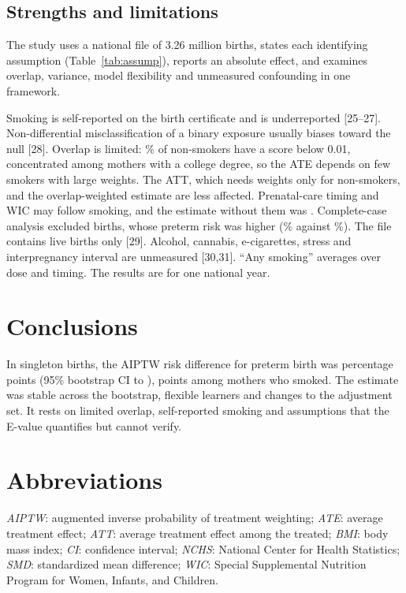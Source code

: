 \documentclass[11pt,letterpaper]{article}
\begin{document}
\subsection*{Strengths and limitations}
The study uses a national file of 3.26 million births, states each identifying assumption (Table~\ref{tab:assump}), reports an absolute effect, and examines overlap, variance, model flexibility and unmeasured confounding in one framework.

Smoking is self-reported on the birth certificate and is underreported [25--27]. Non-differential misclassification of a binary exposure usually biases toward the null [28]. Overlap is limited: \LowNon{}\% of non-smokers have a score below 0.01, concentrated among mothers with a college degree, so the ATE depends on few smokers with large weights. The ATT, which needs weights only for non-smokers, and the overlap-weighted estimate are less affected. Prenatal-care timing and WIC may follow smoking, and the estimate without them was \RDPre{}. Complete-case analysis excluded \NDropped{} births, whose preterm risk was higher (\DroppedPreterm{}\% against \KeptPreterm{}\%). The file contains live births only [29]. Alcohol, cannabis, e-cigarettes, stress and interpregnancy interval are unmeasured [30,31]. ``Any smoking'' averages over dose and timing. The results are for one national year.

\section*{Conclusions}
In \NTotal{} singleton births, the AIPTW risk difference for preterm birth was \RDmain{} percentage points (95\% bootstrap CI \BootLo{} to \BootHi{}), \ATT{} points among mothers who smoked. The estimate was stable across the bootstrap, flexible learners and changes to the adjustment set. It rests on limited overlap, self-reported smoking and assumptions that the E-value quantifies but cannot verify.

\section*{Abbreviations}
\textit{AIPTW}: augmented inverse probability of treatment weighting; \textit{ATE}: average treatment effect; \textit{ATT}: average treatment effect among the treated; \textit{BMI}: body mass index; \textit{CI}: confidence interval; \textit{NCHS}: National Center for Health Statistics; \textit{SMD}: standardized mean difference; \textit{WIC}: Special Supplemental Nutrition Program for Women, Infants, and Children.
\end{document}
